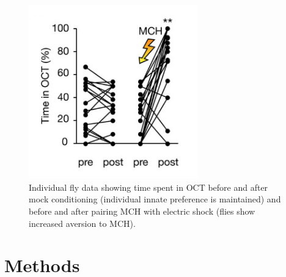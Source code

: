 \documentclass{article}
\begin{document}
\begin{figure}[h]
\begin{center}
\includegraphics[width=0.65\textwidth]{Figures/CC2}
\caption{Individual fly data showing time spent in OCT before and after mock conditioning (individual innate preference is maintained) and before and after pairing MCH with electric shock (flies show increased aversion to MCH).}
\end{center}
\end{figure}


\section{Methods}
\end{document}

